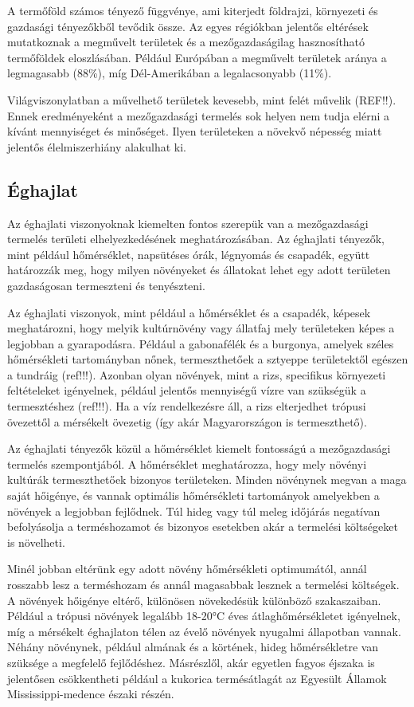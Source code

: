 \documentclass[a4paper,oneside,onecolumn,12pt]{LegrandOrangeBook}
\begin{document}
A termőföld számos tényező függvénye, ami kiterjedt földrajzi, környezeti és gazdasági tényezőkből tevődik össze. Az egyes régiókban jelentős eltérések mutatkoznak a megművelt területek és a mezőgazdaságilag hasznosítható termőföldek eloszlásában. Például Európában a megművelt területek aránya a legmagasabb (88\%), míg Dél-Amerikában a legalacsonyabb (11\%).

Világviszonylatban a művelhető területek kevesebb, mint felét művelik (REF!!). Ennek eredményeként a mezőgazdasági termelés sok helyen nem tudja elérni a kívánt mennyiséget és minőséget. Ilyen területeken a növekvő népesség miatt jelentős élelmiszerhiány alakulhat ki.

\subsection{Éghajlat}

Az éghajlati viszonyoknak kiemelten fontos szerepük van a mezőgazdasági termelés területi elhelyezkedésének meghatározásában. Az éghajlati tényezők, mint például hőmérséklet, napsütéses órák, légnyomás és csapadék, együtt határozzák meg, hogy milyen növényeket és állatokat lehet egy adott területen gazdaságosan termeszteni és tenyészteni. 

Az éghajlati viszonyok, mint például a hőmérséklet és a csapadék, képesek meghatározni, hogy melyik kultúrnövény vagy állatfaj mely területeken képes a legjobban a gyarapodásra. Például a gabonafélék és a burgonya, amelyek széles hőmérsékleti tartományban nőnek, termeszthetőek a sztyeppe területektől egészen a tundráig (ref!!!). Azonban olyan növények, mint a rizs, specifikus környezeti feltételeket igényelnek, például jelentős mennyiségű vízre van szükségük a termesztéshez (ref!!!). Ha a víz rendelkezésre áll, a rizs elterjedhet trópusi övezettől a mérsékelt övezetig (így akár Magyarországon is termeszthető).

Az éghajlati tényezők közül a hőmérséklet kiemelt fontosságú a mezőgazdasági termelés szempontjából. A hőmérséklet meghatározza, hogy mely növényi kultúrák termeszthetőek bizonyos területeken. Minden növénynek megvan a maga saját hőigénye, és vannak optimális hőmérsékleti tartományok amelyekben a növények a legjobban fejlődnek. Túl hideg vagy túl meleg időjárás negatívan befolyásolja a terméshozamot és bizonyos esetekben akár a termelési költségeket is növelheti.

Minél jobban eltérünk egy adott növény hőmérsékleti optimumától, annál rosszabb lesz a terméshozam és annál magasabbak lesznek a termelési költségek. A növények hőigénye eltérő, különösen növekedésük különböző szakaszaiban. Például a trópusi növények legalább 18-20°C éves átlaghőmérsékletet igényelnek, míg a mérsékelt éghajlaton télen az évelő növények nyugalmi állapotban vannak. Néhány növénynek, például almának és a körtének, hideg hőmérsékletre van szüksége a megfelelő fejlődéshez. Másrészlől, akár egyetlen fagyos éjszaka is jelentősen csökkentheti például a kukorica termésátlagát az Egyesült Államok Mississippi-medence északi részén.
\end{document}

